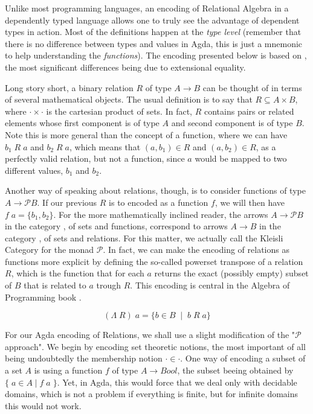 Unlike most programming languages, an encoding of Relational Algebra in a dependently typed 
language allows one to truly see the advantage of dependent types in action. Most of the definitions
happen at the \emph{type level} (remember that there is no difference between types and values in Agda,
this is just a mnemonic to help understanding the \emph{functions}). The encoding presented
below is based on \cite{Jansson09}, the most significant differences being due to
extensional equality.

Long story short, a binary relation $R$ of type $A \rightarrow B$ can be thought of in terms of several mathematical objects.
The usual definition is to say that $R \subseteq A \times B$, where $\cdot\times\cdot$ is the cartesian product of sets.
In fact, $R$ contains pairs or related elements whose first component is of type $A$ and second component is of type $B$.
Note this is more general than the concept of a function, where we can have $b_1\;R\;a$ and $b_2\;R\;a$, which means
that $(a, b_1) \in R$ and $(a, b_2) \in R$, as a perfectly valid relation, but not a function, since $a$ would be mapped to two different values, $b_1$ and $b_2$.

\newcommand{\powerset}{\mathcal{P}}
Another way of speaking about relations, though, is to consider functions of type $A \rightarrow \powerset B$.
If our previous $R$ is to encoded as a function $f$, we will then have $f\; a = \{b_1, b_2\}$. For the more
mathematically inclined reader, the arrows $A \rightarrow \powerset B$ in the category , of sets and
functions, correspond to arrows $A \rightarrow B$ in the category , of sets and relations. For this matter,
we actually call  the Kleisli Category for the monad $\powerset$. 
In fact, we can make the encoding of relations as functions more explicit
by defining the so-called powerset transpose of a relation $R$, which is the function that for each $a$
returns the exact (possibly empty) subset of $B$ that is related to $a$ trough $R$. This encoding is central
in the Algebra of Programming book \cite{Bird97}.

\[ (\Lambda\; R)\; a = \{ b \in B \;\mid\; b\;R\;a \} \]

For our Agda encoding of Relations, we shall use a slight modification of the "$\powerset$ approach".
We begin by encoding set theoretic notions, the most important of all being undoubtedly
the membership notion $\cdot \in \cdot$. One way of encoding a subset of a set $A$ is using a function $f$
of type $A \rightarrow Bool$, the subset beeing obtained by $\{\; a \in A\; |\; f\;a\; \}$. Yet, in Agda, this would
force that we deal only with decidable domains, which is not a problem if everything is finite, but
for infinite domains this would not work.


